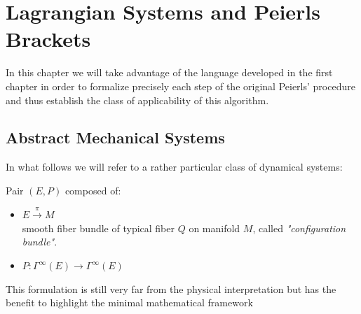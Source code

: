 \documentclass[Main]{subfiles}
\begin{document}
\chapter{Lagrangian Systems and Peierls Brackets}
In this chapter we will take advantage of the language developed in the first chapter in order to  formalize precisely each step of the original Peierls' procedure\cite{Peierls1952} and thus establish the class of applicability of this algorithm. 
  
	\section{Abstract Mechanical Systems}
	In what follows we will refer to a rather particular class of dynamical systems:
	
	\begin{definition}%
		Pair $(E,P )$ composed of:
		\begin{itemize}
			\item $E \xrightarrow{\pi} M$ \\
			smooth fiber bundle of typical fiber $Q$ on  manifold $M$, called \emph{"configuration bundle"}.
			\item	$ P : \Gamma^\infty(E) \rightarrow \Gamma^\infty(E)$ %
		\end{itemize}
	\end{definition}
	This formulation is still very far from the physical interpretation but has the benefit to highlight the minimal mathematical framework
	
\end{document}
